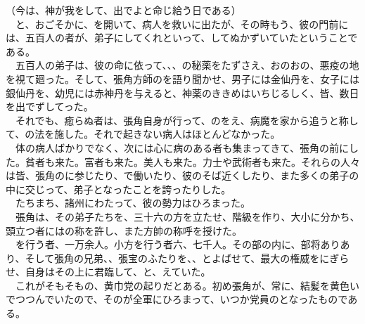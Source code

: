 \documentclass[
  paper=a5,
  fontsize=10pt,
  jafontsize=9.5pt,
  tate,                  %
  open_bracket_pos=nibu, %
]{jlreq}
\begin{document}
（今は、神が我をして、出でよと命じ給う日である）\\


　と、おごそかに、を開いて、病人を救いに出たが、その時もう、彼の門前には、五百人の者が、弟子にしてくれといって、してぬかずいていたということである。\\


　五百人の弟子は、彼の命に依って、、、の秘薬をたずさえ、おのおの、悪疫の地を視て廻った。そして、張角方師のを語り聞かせ、男子には金仙丹を、女子には銀仙丹を、幼児には赤神丹を与えると、神薬のききめはいちじるしく、皆、数日を出でずしてった。\\


　それでも、癒らぬ者は、張角自身が行って、のをえ、病魔を家から追うと称して、の法を施した。それで起きない病人はほとんどなかった。\\


　体の病人ばかりでなく、次には心に病のある者も集まってきて、張角の前にした。貧者も来た。富者も来た。美人も来た。力士や武術者も来た。それらの人々は皆、張角のに参じたり、で働いたり、彼のそば近くしたり、また多くの弟子の中に交じって、弟子となったことを誇ったりした。\\


　たちまち、諸州にわたって、彼の勢力はひろまった。\\


　張角は、その弟子たちを、三十六の方を立たせ、階級を作り、大小に分かち、頭立つ者にはの称を許し、また方帥の称呼を授けた。\\


　を行う者、一万余人。小方を行う者六、七千人。その部の内に、部将ありあり、そして張角の兄弟、、張宝のふたりを、、とよばせて、最大の権威をにぎらせ、自身はその上に君臨して、と、えていた。\\


　これがそもそもの、黄巾党の起りだとある。初め張角が、常に、結髪を黄色いでつつんでいたので、そのが全軍にひろまって、いつか党員のとなったものである。\\
\end{document}
